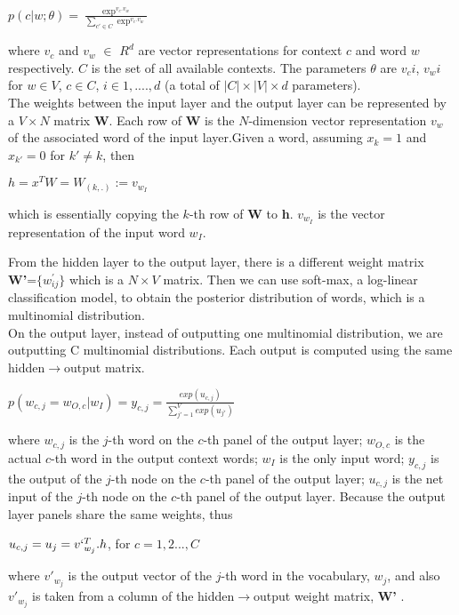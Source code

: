 \begin{center} $p(c|w;\theta)=\frac{\exp^{v_c.v_w}}{\sum_{c' \in C}\exp^{v_c.v_w}}$ \end{center}
where $v_c$ and $v_w$ $\in$ $R^d$ are vector representations for context $c$ and word $w$ respectively. $C$ is the set of all available contexts. The parameters $\theta$ are $v_ci$, $v_wi$ for $w \in V$, $c \in C$, $i \in 1,....,d$ (a total of $|C| \times |V| \times d$ parameters).\\

The weights between the input layer and the output layer can be represented by a $V \times N$ matrix \textbf{W}. Each row of \textbf{W} is the $N$-dimension vector representation $v_w$ of the associated word of the input layer.Given a word, assuming $x_k=1$ and $x_{k'}=0$ for $k' \neq k$, then
\begin{center}
$h=x^TW=W_{(k,.)}:=v_{w_I}$
\end{center}
which is essentially copying the $k$-th row of \textbf{W} to \textbf{h}. $v_{w_I}$ is the vector representation of the input word $w_I$.

From the hidden layer to the output layer, there is a different weight matrix \textbf{W'}=$\{w_{ij}^{'}\}$ which is a $N \times V$ matrix. Then we can use soft-max, a log-linear classification model, to obtain the posterior distribution of words, which is a multinomial distribution.\\
On the output layer, instead of outputting one multinomial distribution, we are outputting C multinomial distributions. Each output is computed using the same hidden$\rightarrow$output matrix.
\begin{center}
$p(w_{c,j}=w_{O,c}|w_I)=y_{c,j}=\frac{exp(u_{c,j})}{\sum_{j'=1}^{V}exp(u_{j'})}$
\end{center}
where $w_{c,j}$ is the $j$-th word on the $c$-th panel of the output layer; $w_{O,c}$ is the actual $c$-th word in the output context words; $w_I$ is the only input word; $y_{c,j}$ is the output of the $j$-th node on the $c$-th panel of the output layer; $u_{c,j}$ is the net input of the $j$-th node on the $c$-th panel of the output layer.
Because the output layer panels share the same weights, thus
\begin{center}
$u_{c,j}=u_j=v`_{w_j}^T.h$, for $c=1,2...,C$
\end{center}
where $v'_{w_j}$ is the output vector of the $j$-th word in the vocabulary, $w_j$, and also $v'_{w_j}$ is taken from a column of the hidden$\rightarrow$output weight matrix, \textbf{W'} .

